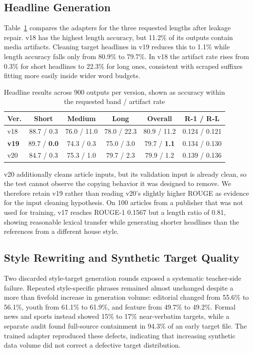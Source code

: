 \documentclass[a4paper,conference]{IEEEtran}
\begin{document}
\subsection{Headline Generation}
Table~\ref{tab:headline} compares the adapters for the three requested lengths after leakage
repair. v18 has the highest length accuracy, but 11.2\% of its outputs contain
media artifacts. Cleaning target headlines in v19 reduces this to 1.1\% while
length accuracy falls only from 80.9\% to 79.7\%. In v18 the artifact rate
rises from 0.3\% for short headlines to 22.3\% for long ones, consistent with
scraped suffixes fitting more easily inside wider word budgets.

\begin{table}[!t]
\caption{Headline results across 900 outputs per version, shown as accuracy within the requested band / artifact rate}
\label{tab:headline}
\centering
\footnotesize
\setlength{\tabcolsep}{2.2pt}
\renewcommand{\arraystretch}{1.04}
\begin{tabular}{|l|c|c|c|c|c|}
\hline
\textbf{Ver.} & \textbf{Short} & \textbf{Medium} & \textbf{Long} & \textbf{Overall} & \textbf{R-1 / R-L} \\
\hline
v18 & 88.7 / 0.3 & 76.0 / 11.0 & 78.0 / 22.3 & 80.9 / 11.2 & 0.124 / 0.121 \\
\hline
\textbf{v19} & 89.7 / \textbf{0.0} & 74.3 / 0.3 & 75.0 / 3.0 & 79.7 / \textbf{1.1} & 0.134 / 0.130 \\
\hline
v20 & 84.7 / 0.3 & 75.3 / 1.0 & 79.7 / 2.3 & 79.9 / 1.2 & 0.139 / 0.136 \\
\hline
\end{tabular}
\end{table}

v20 additionally cleans article inputs, but its validation input is already
clean, so the test cannot observe the copying behavior it was designed to
remove. We therefore retain v19 rather than reading v20's slightly higher
ROUGE as evidence for the input cleaning hypothesis. On 100 articles from a
publisher that was not used for training, v17 reaches ROUGE-1 0.1567 but a length ratio of 0.81,
showing reasonable lexical transfer while generating shorter headlines than the references from a different
house style.

\subsection{Style Rewriting and Synthetic Target Quality}
Two discarded style-target generation rounds exposed a systematic teacher-side
failure. Repeated style-specific phrases remained almost unchanged despite a
more than fivefold increase in generation volume: editorial changed from
55.6\% to 56.1\%, youth from 61.1\% to 61.9\%, and feature from 49.7\% to
49.2\%. Formal news and sports instead showed 15\% to 17\% near-verbatim
targets, while a separate audit found full-source containment in 94.3\% of an
early target file. The trained adapter reproduced these defects, indicating
that increasing synthetic data volume did not correct a defective target
distribution.
\end{document}
